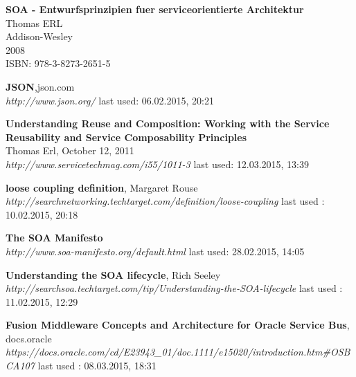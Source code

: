 \documentclass[12pt]{article}
\begin{document}
\begin{thebibliography}{56}
   \textbf{SOA - Entwurfsprinzipien fuer serviceorientierte Architektur}\\
   Thomas ERL\\
   Addison-Wesley \\
   2008 \\
	ISBN: 978-3-8273-2651-5 

  \textbf{JSON},json.com \\
  \textit{http://www.json.org/}
  \newline last used: 06.02.2015, 20:21

  
 
   \textbf{Understanding Reuse and Composition: 
Working with the Service Reusability and Service Composability Principles}\\ Thomas Erl, October 12, 2011 \\
  \textit{http://www.servicetechmag.com/i55/1011-3}
  \newline last used: 12.03.2015, 13:39 
 
 
 
 
   \textbf{loose coupling definition}, Margaret Rouse\\
  \textit{ 	 http://searchnetworking.techtarget.com/definition/loose-coupling}
  \newline last used : 10.02.2015, 20:18 	  
  
  


   \textbf{The SOA Manifesto} \\
  \textit{http://www.soa-manifesto.org/default.html}
  \newline last used: 28.02.2015, 14:05
  
 	 
   \textbf{Understanding the SOA lifecycle},  Rich Seeley\\
  \textit{ 	 http://searchsoa.techtarget.com/tip/Understanding-the-SOA-lifecycle}
  \newline last used : 11.02.2015, 12:29 	 
   	    
  
   	  	 
   \textbf{Fusion Middleware Concepts and Architecture for Oracle Service Bus}, docs.oracle\\
  \textit{    	  https://docs.oracle.com/cd/E23943\_01/doc.1111/e15020/introduction.htm\#OSBCA107
}
  \newline last used : 08.03.2015, 18:31 	 
  
  
  

\end{thebibliography}
\end{document}
